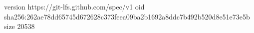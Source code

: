 version https://git-lfs.github.com/spec/v1
oid sha256:262ae78dd65745d672628c373feea09ba2b1692a8ddc7b492b520d8e51e73e5b
size 20538
